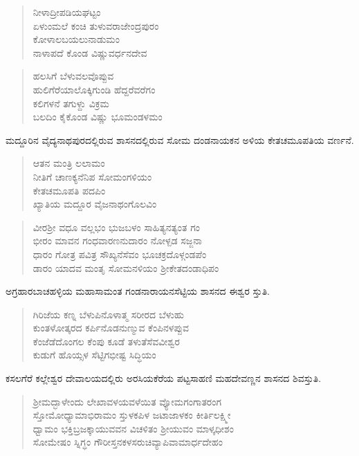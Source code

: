 \begin{verse}
ನೀಳಾದ್ರೀಪಡಿಯಘಟ್ಟಂ \\ ಏಳುಂಮಲೆ ಕಂಚಿ ತುಳುವರಾಜೇಂದ್ರಪುರಂ \\ ಕೋಳಾಲಬಯಲುನಾಡುಮಂ \\ ನಾಳಾಪದೆ ಕೊಂಡ ವಿಷ್ಣುವರ್ಧನದೇವ
\end{verse}

\begin{verse}
ಹಲಸಿಗೆ ಬೆಳುವಲವೊಪ್ಪುವ \\ ಹುಲಿಗೆರೆಯಾಲೊಕ್ಕಿಗುಂಡಿ ಹೆದ್ದರೆವರೆಗಂ \\ ಕಲಿಗಳನೆ ತಗುಳ್ದು ವಿಕ್ರಮ \\ ಬಲದಿಂ ಕೈಕೊಂಡ ವಿಷ್ಣು ಭೂಮಂಡಳಮಂ
\end{verse}

ಮದ್ದೂರಿನ ವೈದ್ಯನಾಥಪುರದಲ್ಲಿರುವ ಶಾಸನದಲ್ಲಿರುವ ಸೋಮ ದಂಡನಾಯಕನ ಅಳಿಯ ಕೇತಚಮೂಪತಿಯ ವರ್ಣನೆ.

\begin{verse}
ಆತನ ಮಂತ್ರಿ ಲಲಾಮಂ \\ ನೀತಿಗೆ ಚಾಣಕ್ಯನೆನಿಪ ಸೋಮಂಗಳಿಯಂ \\ ಕೇತಚಮೂಪತಿ ಪದಪಿಂ \\ ಖ್ಯಾತಿಯ ಮದ್ದೂರ ವೈಜನಾಥಂಗೊಲವಿಂ
\end{verse}

\begin{verse}
ವೀರಶ‍್ರೀ ವಧೂ ವಲ್ಲಭಂ ಭುಜಬಳಂ ಸಾಹಿತ್ಯನತ್ಯಂತ ಗಂ \\ ಭೀರಂ ಮಾವನ ಗಂಧವಾರಣನುದಾರಂ ನೋಳ್ಪಡ ಸಜ್ಜನಾ \\ ಧಾರಂ ಗೋತ್ರ ಪವಿತ್ರ ಸೌಖ್ಯನೆಸೆವಂ ಭೂಚಕ್ರದೊಳ್ಗಂಡಪೆಂ \\ ಡಾರಂ ಯಾದವ ಮಂತೃ ಸೋಮನಳಿಯಂ ಶ‍್ರೀಕೇತದಂಡಾಧಿಪಂ
\end{verse}

ಅಗ್ರಹಾರಬಾಚಹಳ್ಳಿಯ ಮಹಾಸಾಮಂತ ಗಂಡನಾರಾಯನಸೆಟ್ಟಿಯ ಶಾಸನದ ಈಶ್ವರ ಸ್ತುತಿ. 

\begin{verse}
ಗಿರಿಜೆಯ ಕಣ್ನ ಬೆಳುಪಿನೊಳಾತ್ಮ ಸರೀರದ ಬೆಳುಹು \\ ಕುಂತಳೋತ್ಕರದ ಕರ್ಪಿನೊಡನುಣ್ಮುವ ಕೆಂಪಿನಳಪ್ಪುವ \\ ಕೆಂಜೆಡೆದೊಂಗಲ ಕೆಂಪು ಕೂಡೆ ತಳುತೆಸೆವವೀಶ್ವರ \\ ಕುಡುಗೆ ಹೊಯ್ಸಳ ಸೆಟ್ಟಿಗಭೀಷ್ಟ ಸಿದ್ಧಿಯಂ
\end{verse}

ಕಸಲಗೆರೆ ಕಲ್ಲೇಶ್ವರ ದೇವಾಲಯದಲ್ಲಿರು ಅರಸಿಯಕೆರೆಯ ಪಟ್ಟಸಾಹಣಿ ಮಹದೇವಣ್ಣನ ಶಾಸನದ ಶಿವಸ್ತುತಿ.

\begin{verse}
 ಶ‍್ರೀಮದ್ಭಾಳೇಂದು ಲೇಖಾವಳಯವಳೆಯಿತ ವ್ಯೋಮಗಂಗಾತರಂಗ \\ ಸ್ತೋಮೋಧ್ಯಾಮಾಭಿರಾಮಂ ಸ್ತುಳಕಪಿಳ ಜಟಾಜಾಳಕಂ ಕೀರ್ತಿಲಕ್ಷ್ಮೀ \\ ಧ್ವಾಮಂ ಭಕ್ತಿಬ್ರಜಕ್ಕಾಯುವವನ ವಿಚಳಿತಂ ಶ‍್ರೀಯುವಂ ಮಾಳ್ಕಧೀಶಂ\\ ಸೋಮೇಷಂ ಸ್ನಿಗ್ಧಂ ಗೌರೀಸ್ತನಕಳಸರುಚಿವ್ಯಾಪಿವಾಮಾರ್ಧದೇಹಂ
\end{verse}

